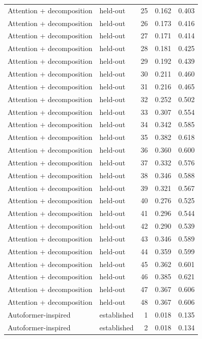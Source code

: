 \begin{tabular}{llrrr}
Attention + decomposition & held-out & 25 & 0.162 & 0.403 \\
Attention + decomposition & held-out & 26 & 0.173 & 0.416 \\
Attention + decomposition & held-out & 27 & 0.171 & 0.414 \\
Attention + decomposition & held-out & 28 & 0.181 & 0.425 \\
Attention + decomposition & held-out & 29 & 0.192 & 0.439 \\
Attention + decomposition & held-out & 30 & 0.211 & 0.460 \\
Attention + decomposition & held-out & 31 & 0.216 & 0.465 \\
Attention + decomposition & held-out & 32 & 0.252 & 0.502 \\
Attention + decomposition & held-out & 33 & 0.307 & 0.554 \\
Attention + decomposition & held-out & 34 & 0.342 & 0.585 \\
Attention + decomposition & held-out & 35 & 0.382 & 0.618 \\
Attention + decomposition & held-out & 36 & 0.360 & 0.600 \\
Attention + decomposition & held-out & 37 & 0.332 & 0.576 \\
Attention + decomposition & held-out & 38 & 0.346 & 0.588 \\
Attention + decomposition & held-out & 39 & 0.321 & 0.567 \\
Attention + decomposition & held-out & 40 & 0.276 & 0.525 \\
Attention + decomposition & held-out & 41 & 0.296 & 0.544 \\
Attention + decomposition & held-out & 42 & 0.290 & 0.539 \\
Attention + decomposition & held-out & 43 & 0.346 & 0.589 \\
Attention + decomposition & held-out & 44 & 0.359 & 0.599 \\
Attention + decomposition & held-out & 45 & 0.362 & 0.601 \\
Attention + decomposition & held-out & 46 & 0.385 & 0.621 \\
Attention + decomposition & held-out & 47 & 0.367 & 0.606 \\
Attention + decomposition & held-out & 48 & 0.367 & 0.606 \\
Autoformer-inspired & established & 1 & 0.018 & 0.135 \\
Autoformer-inspired & established & 2 & 0.018 & 0.134 \\

\end{tabular}
